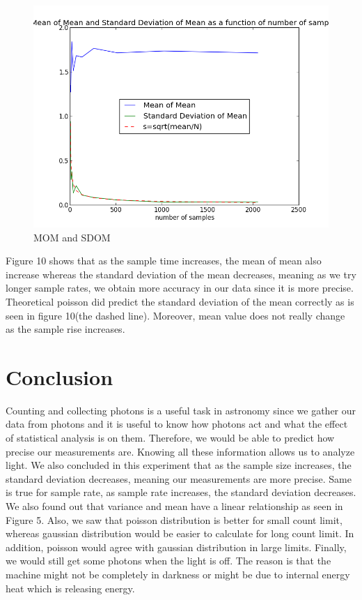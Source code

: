 \documentclass[letterpaper,12pt]{article}
\begin{document}
 
 
 
 
 
\begin{figure}
\centering
\includegraphics[scale=0.6]{part9.png}
\caption{MOM and SDOM }
\end{figure}
 
\newpage Figure 10 shows that as the sample time increases, the mean of mean also increase whereas the standard deviation of the mean decreases, meaning as we try longer sample rates, we obtain more accuracy in our data since it is more precise. Theoretical poisson did predict the standard deviation of the mean correctly as is seen in figure 10(the dashed line). Moreover, mean value does not really change as the sample rise increases.

\section{Conclusion}
\label{sec:conclusion}
Counting and collecting photons is a useful task in astronomy since we gather our data from photons and it is useful to know how photons act and what the effect of statistical analysis is on them. Therefore, we would be able to predict how precise our measurements are. Knowing all these information allows us to analyze light.
We also concluded in this experiment that as the sample size increases, the standard deviation decreases, meaning our measurements are more precise. Same is true for sample rate, as sample rate increases, the standard deviation decreases. We also found out that variance and mean have a linear relationship as seen in Figure 5.
Also, we saw that poisson distribution is better for small count limit, whereas gaussian distribution would be easier to calculate for long count limit. In addition, poisson would agree with gaussian distribution in large limits. 
Finally, we would still get some photons when the light is off. The reason is that the machine might not be completely in darkness or might be due to internal energy heat which is releasing energy.
\end{document}
